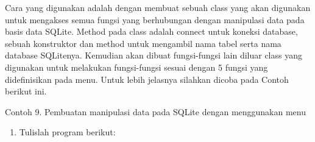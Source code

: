 Cara yang digunakan adalah dengan membuat sebuah class yang akan
digunakan untuk mengakses semua fungsi yang berhubungan dengan
manipulasi data pada basis data SQLite. Method pada class adalah connect
untuk koneksi database, sebuah konstruktor dan method untuk mengambil
nama tabel serta nama database SQLitenya. Kemudian akan dibuat
fungsi-fungsi lain diluar class yang digunakan untuk melakukan
fungsi-fungsi sesuai dengan 5 fungsi yang didefinisikan pada menu. Untuk
lebih jelasnya silahkan dicoba pada Contoh berikut ini.

Contoh 9. Pembuatan manipulasi data pada SQLite dengan menggunakan menu

\begin{enumerate}
\def\labelenumi{\arabic{enumi}.}
\item
  Tulislah program berikut:


\end{enumerate}
